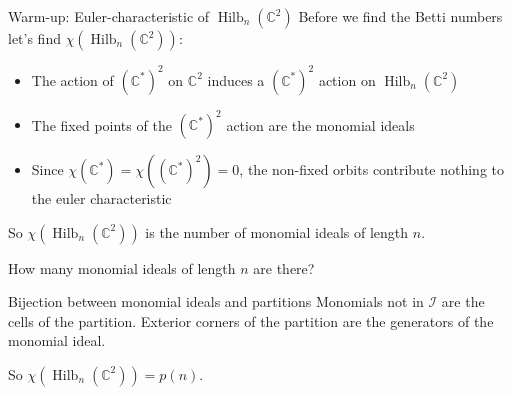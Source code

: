\documentclass{beamer}
\DeclareMathOperator{\Hilb}{Hilb}
\newcommand{\C}{\mathbb{C}}
\begin{document}
\begin{frame}{Warm-up: Euler-characteristic of $\Hilb_n(\C^2)$}
Before we find the Betti numbers let's find $\chi(\Hilb_n(\C^2))$:  

\begin{itemize}
\item The action of $(\C^*)^2$ on $\C^2$ induces a $(\C^*)^2$ action on $\Hilb_n(\C^2)$
\item The fixed points of the $(\C^*)^2$ action are the monomial ideals 
\item Since $\chi(\C^*)=\chi((\C^*)^2)=0$, the non-fixed orbits contribute nothing to the euler characteristic
\end{itemize}
So $\chi(\Hilb_n(\C^2))$ is the number of monomial ideals of length $n$.

\begin{block}{How many monomial ideals of length $n$ are there?}\end{block}



\end{frame}






\begin{frame}{Bijection between monomial ideals and partitions}
Monomials not in $\mathcal{I}$ are the cells of the partition.
Exterior corners of the partition are the generators of the monomial ideal.

\begin{center}


\end{center}
So $\chi(\Hilb_n(\C^2))=p(n)$.
\end{frame}
\end{document}
